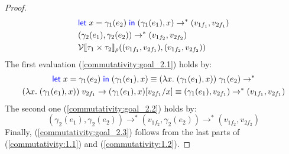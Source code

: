 \documentclass[a4paper, 11pt]{report}
\theoremstyle{definition}
\newcommand{\var}{x}
\newcommand{\expr}{e}
\newcommand{\val}{v}
\newcommand{\subst}[3]{#1{\left[#3 \middle/ #2 \right]}}
\newcommand{\Tprod}[2]{#1 \times #2}
\newcommand{\typ}{\tau}
\newcommand{\step}{\rightarrow}
\newcommand{\stepS}{\rightarrow^*}
\newcommand{\ValInp}[2]{\mathcal{V} \llbracket #1 \rrbracket_{#2}}
\begin{document}
\begin{proof}
  \begin{align}
    &\Let \var = \gamma_1(\expr_2) in (\gamma_1(\expr_1), \var) \stepS (\val_{1f_1}, \val_{2f_1})\label{commutativity:goal_2.1}\\
    &(\gamma_2(\expr_1), \gamma_2(\expr_2)) \stepS (\val_{1f_2}, \val_{2f_2})\label{commutativity:goal_2.2}\\
    &\ValInp{\Tprod{\typ_1}{\typ_2}}{\rho}((\val_{1f_1}, \val_{2f_1}), (\val_{1f_2}, \val_{2f_2}))\label{commutativity:goal_2.3}
  \end{align}
  The first evaluation (\ref*{commutativity:goal_2.1}) holds by:
  \begin{multline*}
    \Let \var = \gamma_1(\expr_2) in (\gamma_1(\expr_1), \var) \equiv (\fun \var . (\gamma_1(\expr_1), \var)) \; \gamma_1(\expr_2) \stepS\\ (\fun \var . (\gamma_1(\expr_1), \var)) \; \val_{2f_1} \step \subst{(\gamma_1(\expr_1), \var)}{\var}{\val_{2f_1}} \equiv (\gamma_1(\expr_1), \val_{2f_1}) \stepS (\val_{1f_1}, \val_{2f_1})
  \end{multline*}
  The second one (\ref*{commutativity:goal_2.2}) holds by:
  \begin{equation*}
    (\gamma_2(\expr_1), \gamma_2(\expr_2)) \stepS (\val_{1f_2}, \gamma_2(\expr_2)) \stepS (\val_{1f_2}, \val_{2f_2})
  \end{equation*}
  Finally, (\ref*{commutativity:goal_2.3}) follows from the last parts of (\ref*{commutativity:1.1}) and (\ref*{commutativity:1.2}).
\end{proof}
\end{document}
